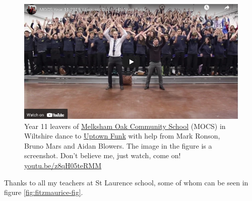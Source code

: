 \documentclass[
]{book}
\begin{document}
\begin{figure}
\includegraphics[width=0.99\linewidth]{images/youtube-mocs-uptown-funk} \caption{Year 11 leavers of \href{https://en.wikipedia.org/wiki/Melksham_Oak_Community_School}{Melksham Oak Community School} (MOCS) in Wiltshire dance to \href{https://en.wikipedia.org/wiki/Uptown_Funk}{Uptown Funk} with help from Mark Ronson, Bruno Mars and Aidan Blowers. The image in the figure is a screenshot. Don't believe me, just watch, come on! \href{https://youtu.be/z8qH05teRMM}{youtu.be/z8qH05teRMM} \citep{uptownfunk, blowers}}\label{fig:uptown-funk-fig}
\end{figure}



Thanks to all my teachers at St Laurence school, some of whom can be seen in figure \ref{fig:fitzmaurice-fig}.
\end{document}
